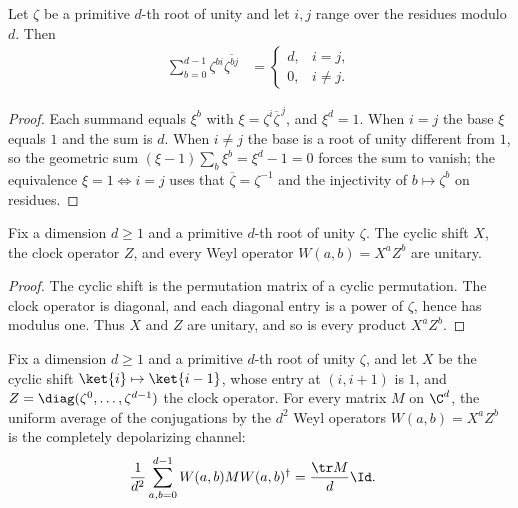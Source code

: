 \begin{lemma}
    \label{lem:root_of_unity_orthogonality}
    \leanok
    Let $\zeta$ be a primitive $d$-th root of unity and let $i,j$ range over the
    residues modulo $d$. Then
    \begin{align}
        \sum_{b=0}^{d-1}\zeta^{bi}\overline{\zeta^{bj}}
         & =
        \begin{cases}
            d, & i=j,    \\
            0, & i\ne j.
        \end{cases}
        \label{eq:entropy_root_orthogonality}
    \end{align}
\end{lemma}

\begin{proof}\leanok
    Each summand equals $\xi^b$ with
    $\xi=\zeta^i\overline{\zeta}^{\,j}$, and $\xi^d=1$. When $i=j$ the
    base $\xi$ equals $1$ and the sum is $d$. When $i\ne j$ the base is a root of
    unity different from $1$, so the geometric sum
    $(\xi-1)\sum_b\xi^b=\xi^d-1=0$ forces the sum to vanish; the
    equivalence $\xi=1\iff i=j$ uses that
    $\overline{\zeta}=\zeta^{-1}$ and the injectivity of
    $b\mapsto\zeta^b$ on residues.
\end{proof}

\begin{theorem}
    \label{thm:weyl_operator_unitary}
    \leanok
    Fix a dimension $d\ge1$ and a primitive $d$-th root of unity $\zeta$.
    The cyclic shift $X$, the clock operator $Z$, and every Weyl operator
    $W(a,b)=X^aZ^b$ are unitary.
\end{theorem}

\begin{proof}\leanok
    The cyclic shift is the permutation matrix of a cyclic permutation. The
    clock operator is diagonal, and each diagonal entry is a power of $\zeta$,
    hence has modulus one. Thus $X$ and $Z$ are unitary, and so is every product
    $X^aZ^b$.
\end{proof}

\begin{theorem}
    \label{thm:weyl_twirl}
    \leanok
    Fix a dimension $d\ge1$ and a primitive $d$-th root of unity $\zeta$, and
    let $X$ be the cyclic shift $\ket{i}\mapsto\ket{i-1}$, whose entry at
    $(i,i+1)$ is $1$, and
    $Z=\diag(\zeta^0,\ldots,\zeta^{d-1})$ the clock operator. For
    every matrix $M$ on $\C^d$, the uniform average of the conjugations
    by the $d^2$ Weyl operators $W(a,b)=X^aZ^b$ is the completely depolarizing
    channel:
    \begin{align}
        \frac{1}{d^2}\sum_{a,b=0}^{d-1}
        W(a,b)MW(a,b)^\dagger
         & =\frac{\tr M}{d}\Id.
        \label{eq:entropy_weyl_twirl}
    \end{align}
\end{theorem}

